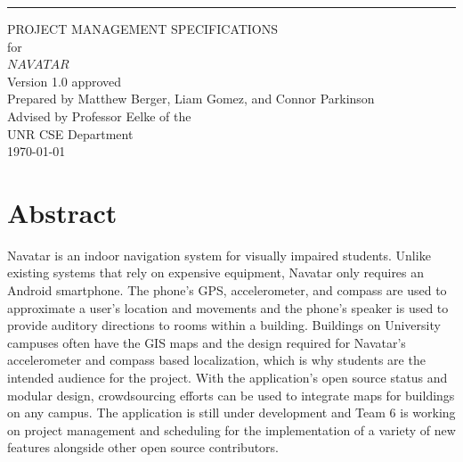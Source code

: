 \documentclass{scrreprt}
\date{}
\def\myversion{1.0 }
\begin{document}
\begin{flushright}
    \rule{16cm}{5pt}\vskip1cm
    \begin{bfseries}
        \Huge{PROJECT MANAGEMENT SPECIFICATIONS}\\
        \vspace{1.6cm}
        for\\
        \vspace{1.6cm}
        $NAVATAR$\\
        \vspace{1.6cm}
        \LARGE{Version \myversion approved}\\
        \vspace{1.6cm}
        Prepared by Matthew Berger, Liam Gomez, and Connor Parkinson\\ 
        \vspace{1.6cm}
        Advised by Professor Eelke of the\\UNR CSE Department\\
        \vspace{1.6cm}
        \today\\
    \end{bfseries}
\end{flushright}

\tableofcontents

\chapter{Abstract}
Navatar is an indoor navigation system for visually impaired students. Unlike existing systems that rely on expensive equipment, Navatar only requires an Android smartphone. The phone’s GPS, accelerometer, and compass are used to approximate a user’s location and movements and the phone’s speaker is used to provide auditory directions to rooms within a building. Buildings on University campuses often have the GIS maps and the design required for Navatar’s accelerometer and compass based localization, which is why students are the intended audience for the project. With the application’s open source status and modular design, crowdsourcing efforts can be used to integrate maps for buildings on any campus. The application is still under development and Team 6 is working on project management and scheduling for the implementation of a variety of new features alongside other open source contributors.
\end{document}
